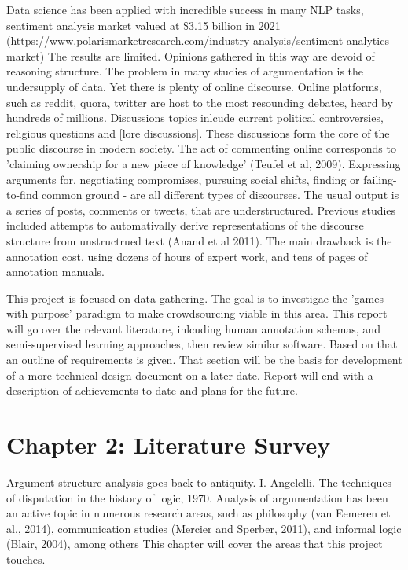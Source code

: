 \documentclass{article}
\begin{document}
Data science has been applied with incredible success in many NLP tasks, sentiment analysis market valued at \$3.15 billion in 2021 (https://www.polarismarketresearch.com/industry-analysis/sentiment-analytics-market)
The results are limited. Opinions gathered in this way are devoid of reasoning structure.
The problem in many studies of argumentation is the undersupply of data.
Yet there is plenty of online discourse.
Online platforms, such as reddit, quora, twitter are host to the most resounding debates, heard by hundreds of millions. 
Discussions topics inlcude current political controversies, religious questions and [lore discussions].
These discussions form the core of the public discourse in modern society. 
The act of commenting online corresponds to 'claiming ownership for a new piece of knowledge' (Teufel et al, 2009).
Expressing arguments for, negotiating compromises, pursuing social shifts, finding or failing-to-find common ground - are all different types of discourses. 
The usual output is a series of posts, comments or tweets, that are understructured. 
Previous studies included attempts to automativally derive representations of the discourse structure from unstructrued text (Anand et al 2011).
The main drawback is the annotation cost, using dozens of hours of expert work, and tens of pages of annotation manuals.

This project is focused on data gathering. The goal is to investigae the 'games with purpose' paradigm to make crowdsourcing viable in this area.
This report will go over the relevant literature, inlcuding human annotation schemas, and semi-supervised learning approaches, then review similar software. Based on that an outline of requirements is given. 
That section will be the basis for development of a more technical design document on a later date.
Report will end with a description of achievements to date and plans for the future.

\section{Chapter 2: Literature Survey}
Argument structure analysis goes back to antiquity. I. Angelelli. The techniques of disputation in the history of logic, 1970.
Analysis of argumentation has been an active topic in numerous research areas, such as philosophy (van Eemeren et al., 2014), communication studies (Mercier and Sperber, 2011), and informal logic (Blair, 2004), among others
This chapter will cover the areas that this project touches.
\end{document}
